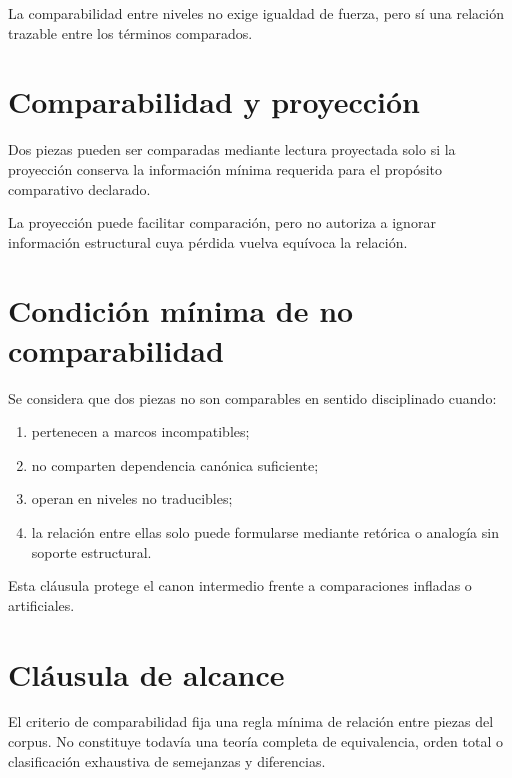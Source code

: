 \begin{observation}
La comparabilidad entre niveles no exige igualdad de fuerza, pero sí una relación trazable entre los términos comparados.
\end{observation}

\section{Comparabilidad y proyección}
\begin{definition}
Dos piezas pueden ser comparadas mediante lectura proyectada solo si la proyección conserva la información mínima requerida para el propósito comparativo declarado.
\end{definition}

\begin{observation}
La proyección puede facilitar comparación, pero no autoriza a ignorar información estructural cuya pérdida vuelva equívoca la relación.
\end{observation}

\section{Condición mínima de no comparabilidad}
\begin{definition}
Se considera que dos piezas no son comparables en sentido disciplinado cuando:
\begin{enumerate}
  \item pertenecen a marcos incompatibles;
  \item no comparten dependencia canónica suficiente;
  \item operan en niveles no traducibles;
  \item la relación entre ellas solo puede formularse mediante retórica o analogía sin soporte estructural.
\end{enumerate}
\end{definition}

\begin{observation}
Esta cláusula protege el canon intermedio frente a comparaciones infladas o artificiales.
\end{observation}

\section{Cláusula de alcance}
\begin{observation}
El criterio de comparabilidad fija una regla mínima de relación entre piezas del corpus. No constituye todavía una teoría completa de equivalencia, orden total o clasificación exhaustiva de semejanzas y diferencias.
\end{observation}

